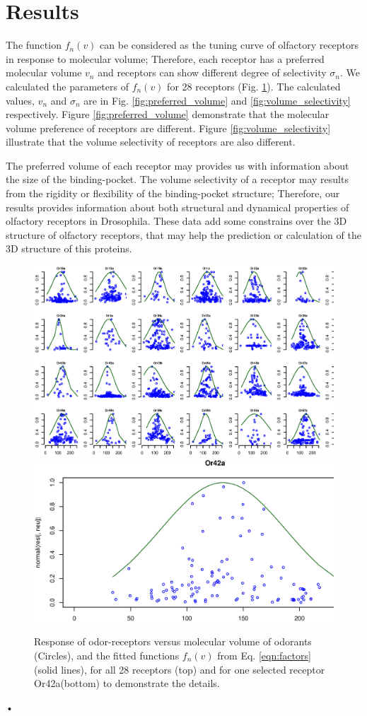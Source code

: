 \documentclass[11pt]{paper} %
\begin{document}
\section{Results}

The function $f_n(v)$ can be considered as the tuning curve of olfactory receptors in response to molecular volume;
Therefore, each receptor has a preferred molecular volume $v_n$ and receptors can show different degree of selectivity $\sigma_n$.
We calculated the parameters of $f_n(v)$ for 28 receptors (Fig. \ref{fig:vol-res}). 
The calculated values, $v_n$ and $\sigma_n$ are in Fig. \ref{fig:preferred_volume} and \ref{fig:volume_selectivity} respectively.
Figure \ref{fig:preferred_volume} demonstrate that the molecular volume preference of receptors are different. 
Figure \ref{fig:volume_selectivity} illustrate that the volume selectivity of receptors are also different.

The preferred volume of each receptor may provides us with information about the size of the binding-pocket.
The volume selectivity of a receptor may results from the rigidity or flexibility of the binding-pocket structure; 
Therefore, our results provides information about both structural and dynamical properties of olfactory receptors in Drosophila. 
These data add some constrains over the 3D structure of olfactory receptors, 
that may help the prediction or calculation of the 3D structure of this proteins.


\begin{figure}
	\centering
	\includegraphics[width=\textwidth]{fig/vol-res}
	\includegraphics[width=0.75 \textwidth]{fig/vol-res-Or42a}
	\caption{Response of odor-receptors  versus molecular volume of odorants (Circles), and the fitted functions $f_n(v)$ from Eq. \ref{eqn:factors} (solid lines), 
	for all 28 receptors (top) and for one selected receptor Or42a(bottom) to demonstrate the details. }
	\label{fig:vol-res}
\end{figure}•
\end{document}
